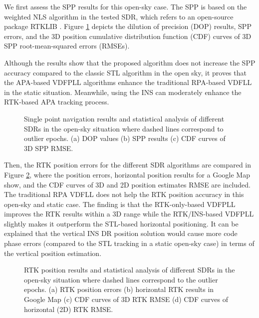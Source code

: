 \documentclass{article}
\newcommand{\reffig}[1]{Figure \ref{#1}}
\begin{document}
We first assess the SPP results for this open-sky case. The SPP is based on the weighted NLS algorithm in the tested SDR, which refers to an open-source package RTKLIB \cite{Takasu2009}. \reffig{fig:fig7} depicts the dilution of precision (DOP) results, SPP errors, and the 3D position cumulative distribution function (CDF) curves of 3D SPP root-mean-squared errors (RMSEs). 

Although the results show that the proposed algorithm does not increase the SPP accuracy compared to the classic STL algorithm in the open sky, it proves that the APA-based VDFPLL algorithms enhance the traditional RPA-based VDFLL in the static situation. Meanwhile, using the INS can moderately enhance the RTK-based APA tracking process. 


\begin{figure}%
\centering
{}%
\hfil
{}%
\hfil
{}%
\caption{Single point navigation results and statistical analysis of different SDRs in the open-sky situation where dashed lines correspond to outlier epochs. (a) DOP values (b) SPP results (c) CDF curves of 3D SPP RMSE.}%
\label{fig:fig7}%
\end{figure}

Then, the RTK position errors for the different SDR algorithms are compared in \reffig{fig:fig8}, where the position errors, horizontal position results for a Google Map show, and the CDF curves of 3D and 2D position estimates RMSE are included. The traditional RPA VDFLL does not help the RTK position accuracy in this open-sky and static case. The finding is that the RTK-only-based VDFPLL improves the RTK results within a 3D range while the RTK/INS-based VDFPLL slightly makes it outperform the STL-based horizontal positioning. It can be explained that the vertical INS DR position solution would cause more code phase errors (compared to the STL tracking in a static open-sky case) in terms of the vertical position estimation. 

\begin{figure}[htbp]%
\centering
{}%
\hfil
{}%
\hfil
{}%
\hfil
{}%
\caption{RTK position results and statistical analysis of different SDRs in the open-sky situation where dashed lines correspond to the outlier epochs. (a) RTK position errors (b) horizontal RTK results in Google Map (c) CDF curves of 3D RTK RMSE (d) CDF curves of horizontal (2D) RTK RMSE. }%
\label{fig:fig8}%
\end{figure}
\end{document}
